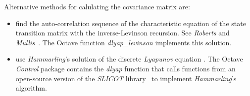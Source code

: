 \documentclass[a4paper,twoside,10pt,english]{report}
\begin{document}
Alternative methods for calulating the covariance matrix are:
\begin{itemize}
\item find the auto-correlation sequence of the characteristic equation 
of the state transition matrix with the inverse-Levinson recursion. See 
\emph{Roberts} and
\emph{Mullis}~\cite[Section 9.11, p. 393]{RobertsMullis_DigitalSignalProcessing}.
The Octave function \emph{dlyap\_levinson} implements this solution.
\item use \emph{Hammarling}'s solution of the discrete \emph{Lyapunov} equation
\cite{Hammarling_SolutionDiscreteLyapunov}. The Octave \emph{Control} package
contains the \emph{dlyap} function that calls functions from an open-source 
version of the \emph{SLICOT} library~\cite{Slicot_ControlSystemsLibrary} to
implement \emph{Hammarling}'s algorithm. 
\end{itemize}
\end{document}
